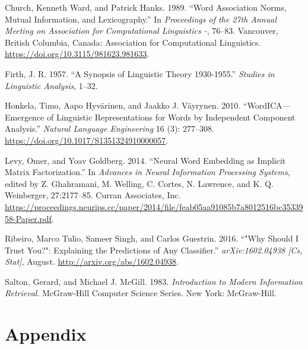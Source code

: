 \documentclass{article}
\begin{document}
\leavevmode\hypertarget{ref-church_word_1989}{}%
Church, Kenneth Ward, and Patrick Hanks. 1989. ``Word Association Norms,
Mutual Information, and Lexicography.'' In \emph{Proceedings of the 27th
Annual Meeting on Association for Computational Linguistics -}, 76--83.
Vancouver, British Columbia, Canada: Association for Computational
Linguistics. \url{https://doi.org/10.3115/981623.981633}.

\leavevmode\hypertarget{ref-firth_synopsis_1957}{}%
Firth, J. R. 1957. ``A Synopsis of Linguistic Theory 1930-1955.''
\emph{Studies in Linguistic Analysis}, 1--32.

\leavevmode\hypertarget{ref-honkela_wordicaemergence_2010}{}%
Honkela, Timo, Aapo Hyvärinen, and Jaakko J. Väyrynen. 2010.
``WordICA---Emergence of Linguistic Representations for Words by
Independent Component Analysis.'' \emph{Natural Language Engineering} 16
(3): 277--308. \url{https://doi.org/10.1017/S1351324910000057}.

\leavevmode\hypertarget{ref-levy_neural_2014}{}%
Levy, Omer, and Yoav Goldberg. 2014. ``Neural Word Embedding as Implicit
Matrix Factorization.'' In \emph{Advances in Neural Information
Processing Systems}, edited by Z. Ghahramani, M. Welling, C. Cortes, N.
Lawrence, and K. Q. Weinberger, 27:2177--85. Curran Associates, Inc.
\url{https://proceedings.neurips.cc/paper/2014/file/feab05aa91085b7a8012516bc3533958-Paper.pdf}.

\leavevmode\hypertarget{ref-ribeiro_why_2016}{}%
Ribeiro, Marco Tulio, Sameer Singh, and Carlos Guestrin. 2016. ``"Why
Should I Trust You?": Explaining the Predictions of Any Classifier.''
\emph{arXiv:1602.04938 {[}Cs, Stat{]}}, August.
\url{http://arxiv.org/abs/1602.04938}.

\leavevmode\hypertarget{ref-salton_introduction_1983}{}%
Salton, Gerard, and Michael J. McGill. 1983. \emph{Introduction to
Modern Information Retrieval}. McGraw-Hill Computer Science Series. New
York: McGraw-Hill.

\newpage

\hypertarget{appendix}{%
\section*{Appendix}\label{appendix}}

\label{sec:appendix}
\end{document}
